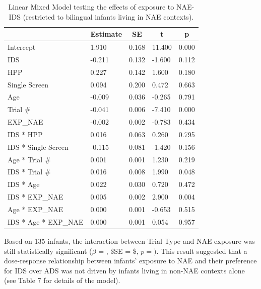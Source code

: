 \documentclass[,man,floatsintext]{apa6}
\begin{document}
\begin{table}[tbp]

\begin{center}
\begin{threeparttable}

\caption{\label{tab:unnamed-chunk-13}Linear Mixed Model testing the effects of exposure to NAE-IDS (restricted to bilingual infants living in NAE contexts).}

\begin{tabular}{lllll}
\toprule
 & \multicolumn{1}{c}{Estimate} & \multicolumn{1}{c}{SE} & \multicolumn{1}{c}{t} & \multicolumn{1}{c}{p}\\
\midrule
Intercept & 1.910 & 0.168 & 11.400 & 0.000\\
IDS & -0.211 & 0.132 & -1.600 & 0.112\\
HPP & 0.227 & 0.142 & 1.600 & 0.180\\
Single Screen & 0.094 & 0.200 & 0.472 & 0.663\\
Age & -0.009 & 0.036 & -0.265 & 0.791\\
Trial \# & -0.041 & 0.006 & -7.410 & 0.000\\
EXP\_NAE & -0.002 & 0.002 & -0.783 & 0.434\\
IDS * HPP & 0.016 & 0.063 & 0.260 & 0.795\\
IDS * Single Screen & -0.115 & 0.081 & -1.420 & 0.156\\
Age * Trial \# & 0.001 & 0.001 & 1.230 & 0.219\\
IDS * Trial \# & 0.016 & 0.008 & 1.990 & 0.048\\
IDS * Age & 0.022 & 0.030 & 0.720 & 0.472\\
IDS * EXP\_NAE & 0.005 & 0.002 & 2.900 & 0.004\\
Age * EXP\_NAE & 0.000 & 0.001 & -0.653 & 0.515\\
IDS * Age * EXP\_NAE & 0.000 & 0.001 & 0.054 & 0.957\\
\bottomrule
\end{tabular}

\end{threeparttable}
\end{center}

\end{table}

Based on 135 infants, the interaction between Trial Type and NAE exposure was still statistically significant (\(\beta\) = , \$SE = \$, \(p = )\). This result suggested that a dose-response relationship between infants' exposure to NAE and their preference for IDS over ADS was not driven by infants living in non-NAE contexts alone (see Table 7 for details of the model).
\end{document}
